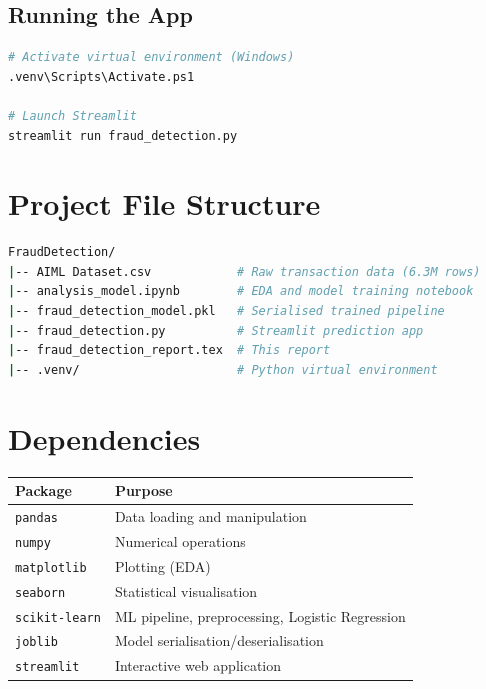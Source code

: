 \documentclass[12pt, a4paper]{article}
\begin{document}
\subsection{Running the App}

\begin{lstlisting}[language=bash]
# Activate virtual environment (Windows)
.venv\Scripts\Activate.ps1

# Launch Streamlit
streamlit run fraud_detection.py
\end{lstlisting}

\section{Project File Structure}

\begin{lstlisting}[language=bash, numbers=none]
FraudDetection/
|-- AIML Dataset.csv            # Raw transaction data (6.3M rows)
|-- analysis_model.ipynb        # EDA and model training notebook
|-- fraud_detection_model.pkl   # Serialised trained pipeline
|-- fraud_detection.py          # Streamlit prediction app
|-- fraud_detection_report.tex  # This report
|-- .venv/                      # Python virtual environment
\end{lstlisting}

\section{Dependencies}

\begin{center}
\begin{tabular}{ll}
\toprule
\textbf{Package} & \textbf{Purpose} \\
\midrule
\texttt{pandas}        & Data loading and manipulation \\
\texttt{numpy}         & Numerical operations \\
\texttt{matplotlib}    & Plotting (EDA) \\
\texttt{seaborn}       & Statistical visualisation \\
\texttt{scikit-learn}  & ML pipeline, preprocessing, Logistic Regression \\
\texttt{joblib}        & Model serialisation/deserialisation \\
\texttt{streamlit}     & Interactive web application \\
\bottomrule
\end{tabular}
\end{center}
\end{document}

